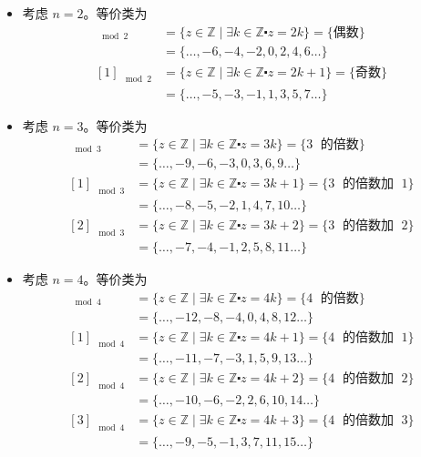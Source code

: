 \begin{itemize}
    \item 考虑 $n=2$。等价类为
        \begin{align*}
            [0]_{\mod 2} &= \{z \in \mathbb{Z} \mid \exists k \in \mathbb{Z} \centerdot z = 2k\} =  \{\text{偶数}\}\\
            &= \{\dots, -6, -4, -2, 0, 2, 4, 6 \dots \}\\
            [1]_{\mod 2} &= \{z \in \mathbb{Z} \mid \exists k \in \mathbb{Z} \centerdot z = 2k+1\} =  \{\text{奇数}\}\\
            &= \{\dots, -5, -3, -1, 1, 3, 5, 7 \dots \}
        \end{align*}
    \item 考虑 $n=3$。等价类为
        \begin{align*}
            [0]_{\mod 3} &= \{z \in \mathbb{Z} \mid \exists k \in \mathbb{Z} \centerdot z = 3k\} =  \{3 \;\text{ 的倍数}\}\\
            &= \{\dots, -9, -6, -3, 0, 3, 6, 9 \dots \}\\
            [1]_{\mod 3} &= \{z \in \mathbb{Z} \mid \exists k \in \mathbb{Z} \centerdot z = 3k+1\} =  \{3 \;\text{ 的倍数加 }\; 1\}\\
            &= \{\dots, -8, -5, -2, 1, 4, 7, 10 \dots \}\\
            [2]_{\mod 3} &= \{z \in \mathbb{Z} \mid \exists k \in \mathbb{Z} \centerdot z = 3k+2\} =  \{3 \;\text{ 的倍数加 }\; 2\}\\
            &= \{\dots, -7, -4, -1, 2, 5, 8, 11 \dots \}
        \end{align*}
    \item 考虑 $n=4$。等价类为
        \begin{align*}
            [0]_{\mod 4} &= \{z \in \mathbb{Z} \mid \exists k \in \mathbb{Z} \centerdot z = 4k\} =  \{4 \;\text{ 的倍数}\}\\
            &= \{\dots, -12, -8, -4, 0, 4, 8, 12 \dots \}\\
            [1]_{\mod 4} &= \{z \in \mathbb{Z} \mid \exists k \in \mathbb{Z} \centerdot z = 4k+1\} =  \{4 \;\text{ 的倍数加 }\; 1\}\\
            &= \{\dots, -11, -7, -3, 1, 5, 9, 13 \dots \}\\
            [2]_{\mod 4} &= \{z \in \mathbb{Z} \mid \exists k \in \mathbb{Z} \centerdot z = 4k+2\} =  \{4 \;\text{ 的倍数加 }\; 2\}\\
            &= \{\dots, -10, -6, -2, 2, 6, 10, 14 \dots \}\\
            [3]_{\mod 4} &= \{z \in \mathbb{Z} \mid \exists k \in \mathbb{Z} \centerdot z = 4k+3\} =  \{4 \;\text{ 的倍数加 }\; 3\}\\
            &= \{\dots, -9, -5, -1, 3, 7, 11, 15 \dots \}
        \end{align*}
\end{itemize}

